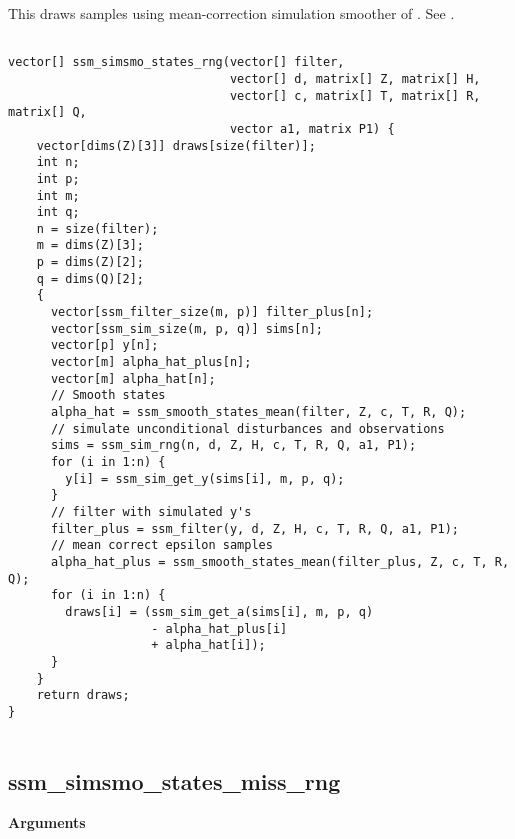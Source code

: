 \documentclass[]{book}
\begin{document}
This draws samples using mean-correction simulation smoother of
\autocite{DurbinKoopman2002}. See \autocite[Sec 4.9]{DurbinKoopman2012}.

\begin{verbatim}

vector[] ssm_simsmo_states_rng(vector[] filter,
                               vector[] d, matrix[] Z, matrix[] H,
                               vector[] c, matrix[] T, matrix[] R, matrix[] Q,
                               vector a1, matrix P1) {
    vector[dims(Z)[3]] draws[size(filter)];
    int n;
    int p;
    int m;
    int q;
    n = size(filter);
    m = dims(Z)[3];
    p = dims(Z)[2];
    q = dims(Q)[2];
    {
      vector[ssm_filter_size(m, p)] filter_plus[n];
      vector[ssm_sim_size(m, p, q)] sims[n];
      vector[p] y[n];
      vector[m] alpha_hat_plus[n];
      vector[m] alpha_hat[n];
      // Smooth states
      alpha_hat = ssm_smooth_states_mean(filter, Z, c, T, R, Q);
      // simulate unconditional disturbances and observations
      sims = ssm_sim_rng(n, d, Z, H, c, T, R, Q, a1, P1);
      for (i in 1:n) {
        y[i] = ssm_sim_get_y(sims[i], m, p, q);
      }
      // filter with simulated y's
      filter_plus = ssm_filter(y, d, Z, H, c, T, R, Q, a1, P1);
      // mean correct epsilon samples
      alpha_hat_plus = ssm_smooth_states_mean(filter_plus, Z, c, T, R, Q);
      for (i in 1:n) {
        draws[i] = (ssm_sim_get_a(sims[i], m, p, q)
                    - alpha_hat_plus[i]
                    + alpha_hat[i]);
      }
    }
    return draws;
}


\end{verbatim}

\subsection{ssm\_simsmo\_states\_miss\_rng}\label{ssm_simsmo_states_miss_rng}

\textbf{Arguments}
\end{document}

